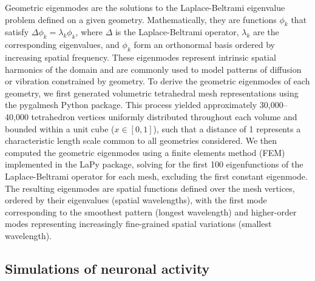 \documentclass{article}
\begin{document}
Geometric eigenmodes are the solutions to the Laplace-Beltrami eigenvalue problem defined on a given geometry. Mathematically, they are functions $\phi_k$ that satisfy $\Delta \phi_k=\lambda_k\phi_k$, where $\Delta$ is the Laplace-Beltrami operator, $\lambda_k$ are the corresponding eigenvalues, and $\phi_k$ form an orthonormal basis ordered by increasing spatial frequency. These eigenmodes represent intrinsic spatial harmonics of the domain and are commonly used to model patterns of diffusion or vibration constrained by geometry. To derive the geometric eigenmodes of each geometry, we first generated volumetric tetrahedral mesh representations using the pygalmesh Python package. This process yielded approximately 30,000–40,000 tetrahedron vertices uniformly distributed throughout each volume and bounded within a unit cube ($x\in[0,1]$), such that a distance of 1 represents a characteristic length scale common to all geometries considered. We then computed the geometric eigenmodes using a finite elements method (FEM) implemented in the LaPy package, solving for the first 100 eigenfunctions of the Laplace-Beltrami operator for each mesh, excluding the first constant eigenmode. The resulting eigenmodes are spatial functions defined over the mesh vertices, ordered by their eigenvalues (spatial wavelengths), with the first mode corresponding to the smoothest pattern (longest wavelength) and higher-order modes representing increasingly fine-grained spatial variations (smallest wavelength).

\subsection*{Simulations of neuronal activity}
\end{document}
